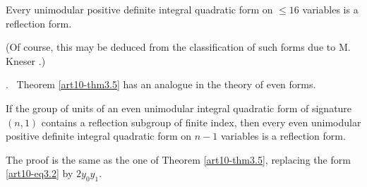 \begin{coro*}
Every unimodular positive definite integral quadratic form on $\leqslant 16$ variables is a reflection form.
\end{coro*}

(Of course, this may be deduced from the classification of such forms due to M. Kneser \cite{art10-key4}.)

.~ Theorem \ref{art10-thm3.5} has an analogue in the theory of even forms. 

\begin{theorem}\label{art10-thm3.6}
If the group of units of an even unimodular integral quadratic form of signature $(n,1)$ contains a reflection subgroup of finite index, then every even unimodular positive definite integral quadratic form on $n-1$ variables is a reflection form. 
\end{theorem}

The proof is the same as the one of Theorem \ref{art10-thm3.5}, replacing the form \ref{art10-eq3.2} by $2 y_0 y_1$.

